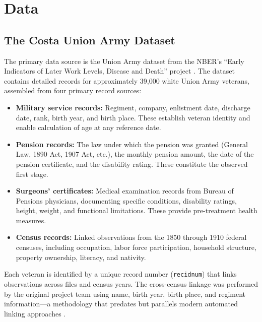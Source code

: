 \documentclass[12pt]{article}
\begin{document}
\section{Data}

\subsection{The Costa Union Army Dataset}

The primary data source is the Union Army dataset from the NBER's ``Early Indicators of Later Work Levels, Disease and Death'' project \citep{fogel1993new, costa1995pensions}. The dataset contains detailed records for approximately 39,000 white Union Army veterans, assembled from four primary record sources:

\begin{itemize}
\item \textbf{Military service records:} Regiment, company, enlistment date, discharge date, rank, birth year, and birth place. These establish veteran identity and enable calculation of age at any reference date.
\item \textbf{Pension records:} The law under which the pension was granted (General Law, 1890 Act, 1907 Act, etc.), the monthly pension amount, the date of the pension certificate, and the disability rating. These constitute the observed first stage.
\item \textbf{Surgeons' certificates:} Medical examination records from Bureau of Pensions physicians, documenting specific conditions, disability ratings, height, weight, and functional limitations. These provide pre-treatment health measures.
\item \textbf{Census records:} Linked observations from the 1850 through 1910 federal censuses, including occupation, labor force participation, household structure, property ownership, literacy, and nativity.
\end{itemize}

Each veteran is identified by a unique record number (\texttt{recidnum}) that links observations across files and census years. The cross-census linkage was performed by the original project team using name, birth year, birth place, and regiment information---a methodology that predates but parallels modern automated linking approaches \citep{abramitzky2021automated, bailey2020automated}.
\end{document}
